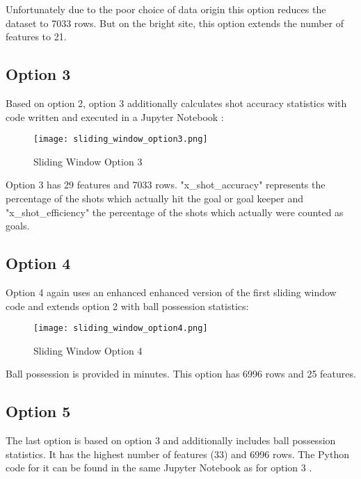 Unfortunately due to the poor choice of data origin this option reduces the dataset to 7033 rows. But on the bright site, this option extends the number of features to 21.

\subsection {Option 3}
Based on option 2, option 3 additionally calculates shot accuracy statistics with code written and executed in a Jupyter Notebook \cite{jupyter_sliding}:

\begin{figure}[H]
\begin{center}
\texttt{[image: sliding\_window\_option3.png]}
\end{center}
\caption{Sliding Window Option 3}
\label{fig:sliding_window_option3}
\end{figure}



Option 3 has 29 features and 7033 rows. "x\_shot\_accuracy" represents the percentage of the shots which actually hit the goal or goal keeper and "x\_shot\_efficiency" the percentage of the shots which actually were counted as goals.


\subsection {Option 4}

Option 4 again uses an enhanced enhanced version \cite{sliding04} of the first sliding window code and extends option 2 with ball possession statistics:

\begin{figure}[H]
\begin{center}
\texttt{[image: sliding\_window\_option4.png]}
\end{center}
\caption{Sliding Window Option 4}
\label{fig:sliding_window_option4}
\end{figure}

Ball possession is provided in minutes. This option has 6996 rows and 25 features.

\subsection {Option 5}
The last option is based on option 3 and additionally includes ball possession statistics. It has the highest number of features (33) and 6996 rows. The Python code for it can be found in the same Jupyter Notebook as for option 3 \cite{jupyter_sliding}.


